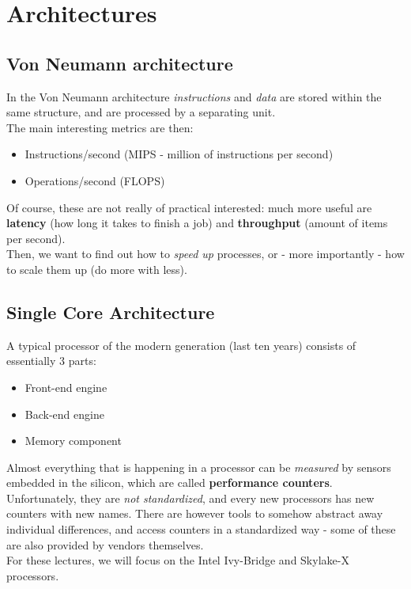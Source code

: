\documentclass[../template.tex]{subfiles}
\begin{document}

\chapter{Architectures}
\section{Von Neumann architecture}
In the Von Neumann architecture \textit{instructions} and \textit{data} are stored within the same structure, and are processed by a separating unit.\\
The main interesting metrics are then:
\begin{itemize}
    \item Instructions/second (MIPS - million of instructions per second)
    \item Operations/second (FLOPS)
\end{itemize}
Of course, these are not really of practical interested: much more useful are \textbf{latency} (how long it takes to finish a job) and \textbf{throughput} (amount of items per second).\\
Then, we want to find out how to \textit{speed up} processes, or - more importantly - how to scale them up (do more with less).

\section{Single Core Architecture}
A typical processor of the modern generation (last ten years) consists of essentially 3 parts:
\begin{itemize}
    \item Front-end engine
    \item Back-end engine
    \item Memory component
\end{itemize}
Almost everything that is happening in a processor can be \textit{measured} by sensors embedded in the silicon, which are called \textbf{performance counters}.\\
Unfortunately, they are \textit{not standardized}, and every new processors has new counters with new names. There are however tools to somehow abstract away individual differences, and access counters in a standardized way - some of these are also provided by vendors themselves.\\
For these lectures, we will focus on the Intel Ivy-Bridge and Skylake-X processors.
\end{document}
